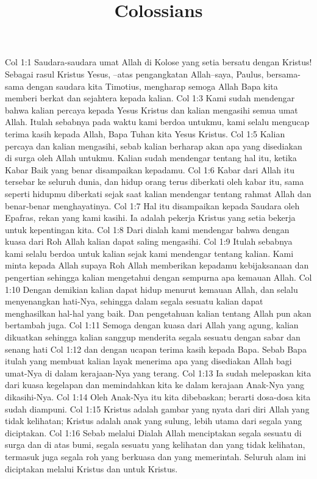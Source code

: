 

\title{Colossians}

Col 1:1  Saudara-saudara umat Allah di Kolose yang setia bersatu dengan Kristus! Sebagai rasul Kristus Yesus, --atas pengangkatan Allah--saya, Paulus, bersama-sama dengan saudara kita Timotius, mengharap semoga Allah Bapa kita memberi berkat dan sejahtera kepada kalian.
Col 1:3  Kami sudah mendengar bahwa kalian percaya kepada Yesus Kristus dan kalian mengasihi semua umat Allah. Itulah sebabnya pada waktu kami berdoa untukmu, kami selalu mengucap terima kasih kepada Allah, Bapa Tuhan kita Yesus Kristus.
Col 1:5  Kalian percaya dan kalian mengasihi, sebab kalian berharap akan apa yang disediakan di surga oleh Allah untukmu. Kalian sudah mendengar tentang hal itu, ketika Kabar Baik yang benar disampaikan kepadamu.
Col 1:6  Kabar dari Allah itu tersebar ke seluruh dunia, dan hidup orang terus diberkati oleh kabar itu, sama seperti hidupmu diberkati sejak saat kalian mendengar tentang rahmat Allah dan benar-benar menghayatinya.
Col 1:7  Hal itu disampaikan kepada Saudara oleh Epafras, rekan yang kami kasihi. Ia adalah pekerja Kristus yang setia bekerja untuk kepentingan kita.
Col 1:8  Dari dialah kami mendengar bahwa dengan kuasa dari Roh Allah kalian dapat saling mengasihi.
Col 1:9  Itulah sebabnya kami selalu berdoa untuk kalian sejak kami mendengar tentang kalian. Kami minta kepada Allah supaya Roh Allah memberikan kepadamu kebijaksanaan dan pengertian sehingga kalian mengetahui dengan sempurna apa kemauan Allah.
Col 1:10  Dengan demikian kalian dapat hidup menurut kemauan Allah, dan selalu menyenangkan hati-Nya, sehingga dalam segala sesuatu kalian dapat menghasilkan hal-hal yang baik. Dan pengetahuan kalian tentang Allah pun akan bertambah juga.
Col 1:11  Semoga dengan kuasa dari Allah yang agung, kalian dikuatkan sehingga kalian sanggup menderita segala sesuatu dengan sabar dan senang hati
Col 1:12  dan dengan ucapan terima kasih kepada Bapa. Sebab Bapa itulah yang membuat kalian layak menerima apa yang disediakan Allah bagi umat-Nya di dalam kerajaan-Nya yang terang.
Col 1:13  Ia sudah melepaskan kita dari kuasa kegelapan dan memindahkan kita ke dalam kerajaan Anak-Nya yang dikasihi-Nya.
Col 1:14  Oleh Anak-Nya itu kita dibebaskan; berarti dosa-dosa kita sudah diampuni.
Col 1:15  Kristus adalah gambar yang nyata dari diri Allah yang tidak kelihatan; Kristus adalah anak yang sulung, lebih utama dari segala yang diciptakan.
Col 1:16  Sebab melalui Dialah Allah menciptakan segala sesuatu di surga dan di atas bumi, segala sesuatu yang kelihatan dan yang tidak kelihatan, termasuk juga segala roh yang berkuasa dan yang memerintah. Seluruh alam ini diciptakan melalui Kristus dan untuk Kristus.
